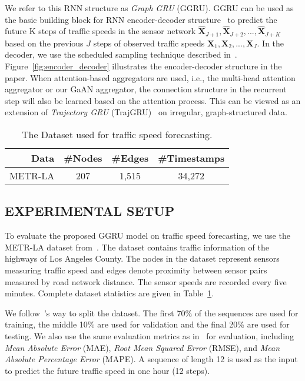 \documentclass{article}
\begin{document}
	We refer to this RNN structure as \emph{Graph GRU} (GGRU). GGRU can be used as the basic building block for RNN encoder-decoder structure~\citep{lin2017structured} to predict the future K steps of traffic speeds in the sensor network $\mathbf{\hat{X}}_{J+1}, \mathbf{\hat{X}}_{J+2}, ..., \mathbf{\hat{X}}_{J + K}$ based on the previous $J$ steps of observed traffic speeds $\mathbf{X}_1, \mathbf{X}_2, ..., \mathbf{X}_J$. In the decoder, we use the scheduled sampling
technique described in~\citep{lin2017structured}. Figure~\ref{fig:encoder_decoder} illustrates the encoder-decoder structure in the paper.
	When attention-based aggregators are used, i.e., the multi-head attention aggregator or our GaAN aggregator, the connection structure in the recurrent step will also be learned based on the attention process. This can be viewed as an extension of \emph{Trajectory GRU} (TrajGRU)~\citep{shi2017deep} on irregular, graph-structured data.
	\begin{table}[!tb]
		\centering
		\caption{The Dataset used for traffic speed forecasting.}
\begin{tabular}{r ccc}
			\hline
			\textbf{Data}  & \#\textbf{Nodes} & \#\textbf{Edges}  & \#\textbf{Timestamps} \\
			\hline \hline
			METR-LA   & 207    & 1,515  & 34,272 \\\hline
\end{tabular}
		\label{table:st_dataset}
\end{table}
	
	\subsection{EXPERIMENTAL SETUP}
To evaluate the proposed GGRU model on traffic speed forecasting, we use the METR-LA dataset from~\citep{li2017graph}. The dataset contains traffic information of the highways of Los Angeles County. The nodes in the dataset represent sensors measuring traffic speed and edges denote proximity between sensor pairs measured by road network distance. The sensor speeds are recorded every five minutes. Complete dataset statistics are given in Table~\ref{table:st_dataset}.
	
	We follow~\citep{li2017graph}'s way to split the dataset. The first 70\% of the sequences are used for training, the middle 10\% are used for validation and the final 20\% are used for testing. We also use the same evaluation metrics as in~\citep{li2017graph} for evaluation, including \emph{Mean Absolute Error} (MAE), \emph{Root Mean Squared Error} (RMSE), and \emph{Mean Absolute Percentage Error} (MAPE). A sequence of length 12 is used as the input to predict the future traffic speed in one hour (12 steps).
	
\end{document}
